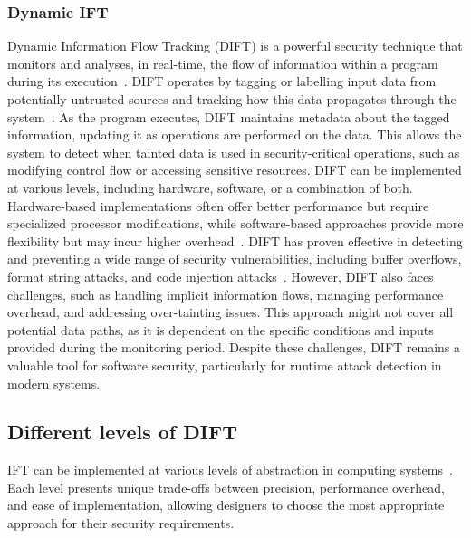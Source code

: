 \subsubsection{Dynamic IFT}
Dynamic Information Flow Tracking (DIFT) is a powerful security technique that monitors and analyses, in real-time, the flow of information within a program during its execution~\cite{CGDJ-21-micromac}. DIFT operates by tagging or labelling input data from potentially untrusted sources and tracking how this data propagates through the system~\cite{SLD-04-sigplan}. As the program executes, DIFT maintains metadata about the tagged information, updating it as operations are performed on the data. This allows the system to detect when tainted data is used in security-critical operations, such as modifying control flow or accessing sensitive resources. DIFT can be implemented at various levels, including hardware, software, or a combination of both. Hardware-based implementations often offer better performance but require specialized processor modifications, while software-based approaches provide more flexibility but may incur higher overhead~\cite{CGDJ-21-micromac}. DIFT has proven effective in detecting and preventing a wide range of security vulnerabilities, including buffer overflows, format string attacks, and code injection attacks~\cite{SLD-04-sigplan}. However, DIFT also faces challenges, such as handling implicit information flows, managing performance overhead, and addressing over-tainting issues.
This approach might not cover all potential data paths, as it is dependent on the specific conditions and inputs provided during the monitoring period.
Despite these challenges, DIFT remains a valuable tool for software security, particularly for runtime attack detection in modern systems.

\subsection{Different levels of DIFT}
IFT can be implemented at various levels of abstraction in computing systems~\cite{HAK-21-acmcsur, BSMCVEJCO-21-acmcsur,CGDJ-21-micromac}. Each level presents unique trade-offs between precision, performance overhead, and ease of implementation, allowing designers to choose the most appropriate approach for their security requirements.

